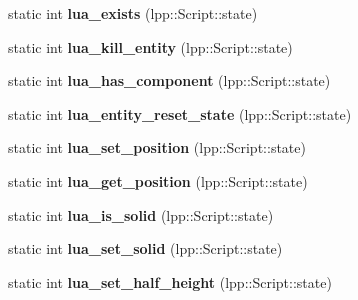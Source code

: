 \begin{DoxyCompactItemize}
\item 
static int {\bfseries lua\+\_\+exists} (lpp\+::\+Script\+::state)\hypertarget{class_lua_interface_ac99d5676231b062222ff952e502a4d43}{}\label{class_lua_interface_ac99d5676231b062222ff952e502a4d43}

\item 
static int {\bfseries lua\+\_\+kill\+\_\+entity} (lpp\+::\+Script\+::state)\hypertarget{class_lua_interface_aefc61abe07e0392c9c4e2181919e4dab}{}\label{class_lua_interface_aefc61abe07e0392c9c4e2181919e4dab}

\item 
static int {\bfseries lua\+\_\+has\+\_\+component} (lpp\+::\+Script\+::state)\hypertarget{class_lua_interface_a2170bf2c65bd3e62e96904014b3cd70d}{}\label{class_lua_interface_a2170bf2c65bd3e62e96904014b3cd70d}

\item 
static int {\bfseries lua\+\_\+entity\+\_\+reset\+\_\+state} (lpp\+::\+Script\+::state)\hypertarget{class_lua_interface_ae37b7ef3833f90fcd8c020fe60890c25}{}\label{class_lua_interface_ae37b7ef3833f90fcd8c020fe60890c25}

\item 
static int {\bfseries lua\+\_\+set\+\_\+position} (lpp\+::\+Script\+::state)\hypertarget{class_lua_interface_aefc3e8bff6f801e5f0bc9095ab36a1d7}{}\label{class_lua_interface_aefc3e8bff6f801e5f0bc9095ab36a1d7}

\item 
static int {\bfseries lua\+\_\+get\+\_\+position} (lpp\+::\+Script\+::state)\hypertarget{class_lua_interface_aafce323aed4cb7812223c7514a278a9e}{}\label{class_lua_interface_aafce323aed4cb7812223c7514a278a9e}

\item 
static int {\bfseries lua\+\_\+is\+\_\+solid} (lpp\+::\+Script\+::state)\hypertarget{class_lua_interface_acf250c6d57963d3ecaa6843935a0cf42}{}\label{class_lua_interface_acf250c6d57963d3ecaa6843935a0cf42}

\item 
static int {\bfseries lua\+\_\+set\+\_\+solid} (lpp\+::\+Script\+::state)\hypertarget{class_lua_interface_a53f9c214c7701e798fa576bbcf0c7282}{}\label{class_lua_interface_a53f9c214c7701e798fa576bbcf0c7282}

\item 
static int {\bfseries lua\+\_\+set\+\_\+half\+\_\+height} (lpp\+::\+Script\+::state)\hypertarget{class_lua_interface_a242c16b37985033584b2d27f078e5286}{}\label{class_lua_interface_a242c16b37985033584b2d27f078e5286}


\end{DoxyCompactItemize}

